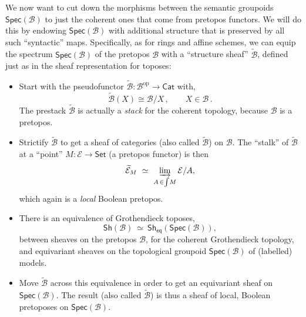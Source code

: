 \documentclass[12pt]{article}
\newcommand{\B}{\ensuremath{\mathcal{B}}}
\newcommand{\E}{\ensuremath{\mathcal{E}}}
\newcommand{\Set}{\ensuremath{\mathsf{Set}}}
\theoremstyle{remark}
\theoremstyle{definition}
\begin{document}
We now want to cut down the morphisms between the semantic groupoids $\mathsf{Spec}(\mathcal{B})$ to just the coherent ones that come from pretopos functors.  We will do this by endowing $\mathsf{Spec}(\mathcal{B})$ with additional structure that is preserved by all such ``syntactic'' maps.   Specifically, as for rings and affine schemes, we can equip the spectrum $\mathsf{Spec}(\mathcal{B})$ of the pretopos $\mathcal{B}$ with a ``structure sheaf'' $\widetilde{\mathcal{B}}$,  defined just as in the sheaf representation for toposes: 
\begin{itemize}
\item Start with the pseudofunctor $\widetilde{\mathcal{B}} : \mathcal{B}^{\mathrm{op}}\to\mathsf{Cat}$ with,
\[
\widetilde{\mathcal{B}}(X) \cong \mathcal{B}/X\,,\qquad X\in \B\,.
\]
The prestack $\widetilde{\mathcal{B}}$ is actually a \emph{stack} for the coherent topology, because $\mathcal{B}$ is a pretopos.
 
\item Strictify $\widetilde{\B}$ to get a sheaf of categories (also called $\widetilde{\mathcal{B}}$) on $\mathcal{B}$.  The ``stalk'' of $\widetilde{\mathcal{B}}$ at a ``point'' $M : \E\to \Set$ (a pretopos functor) is then 
\[
\widetilde{\E}_{M}\ \simeq\ \varinjlim_{A\,\in\int\!{M}}\E/A, 
\]
which again is a \emph{local} Boolean pretopos.

\item There is an equivalence of Grothendieck toposes,
\[
\mathsf{Sh}(\B)\ \simeq\ \mathsf{Sh}_{\mathsf{eq}}(\mathsf{Spec}(\mathcal{B})),
\]
between sheaves on the pretopos $\B$, for the coherent Grothendieck topology, and equivariant sheaves on the topological groupoid $\mathsf{Spec}(\mathcal{B})$ of (labelled) models. 

\item Move $\widetilde{\mathcal{B}}$ across this equivalence in order to get an equivariant sheaf on $\mathsf{Spec}(\mathcal{B})$.  The result (also called $\widetilde{\mathcal{B}}$) is thus a sheaf of local, Boolean pretoposes on $\mathsf{Spec}(\mathcal{B})$.  

\end{itemize}
\end{document}

